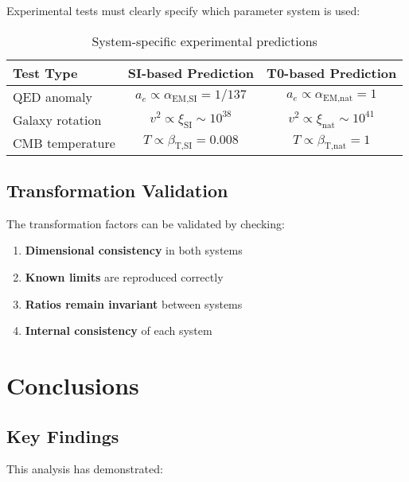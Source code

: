 \documentclass[12pt,a4paper]{article}
\newcommand{\xipar}{\xi}
\newcommand{\alphaEMSI}{\alpha_{\text{EM,SI}}}
\newcommand{\alphaEMnat}{\alpha_{\text{EM,nat}}}
\newcommand{\betaTSI}{\beta_{\text{T,SI}}}
\newcommand{\betaTnat}{\beta_{\text{T,nat}}}
\begin{document}
	Experimental tests must clearly specify which parameter system is used:
	
	\begin{table}[htbp]
		\centering
		\begin{tabular}{lcc}
			\toprule
			\textbf{Test Type} & \textbf{SI-based Prediction} & \textbf{T0-based Prediction} \\
			\midrule
			QED anomaly & $a_e \propto \alphaEMSI = 1/137$ & $a_e \propto \alphaEMnat = 1$ \\
			Galaxy rotation & $v^2 \propto \xipar_{\text{SI}} \sim 10^{38}$ & $v^2 \propto \xipar_{\text{nat}} \sim 10^{41}$ \\
			CMB temperature & $T \propto \betaTSI = 0.008$ & $T \propto \betaTnat = 1$ \\
			\bottomrule
		\end{tabular}
		\caption{System-specific experimental predictions}
		\label{tab:system_predictions}
	\end{table}
	
	\subsection{Transformation Validation}
	\label{subsec:transformation_validation}
	
	The transformation factors can be validated by checking:
	
	\begin{enumerate}
		\item \textbf{Dimensional consistency} in both systems
		\item \textbf{Known limits} are reproduced correctly
		\item \textbf{Ratios remain invariant} between systems
		\item \textbf{Internal consistency} of each system
	\end{enumerate}
	
	\section{Conclusions}
	\label{sec:conclusions}
	
	\subsection{Key Findings}
	\label{subsec:key_findings}
	
	This analysis has demonstrated:
	
\end{document}
